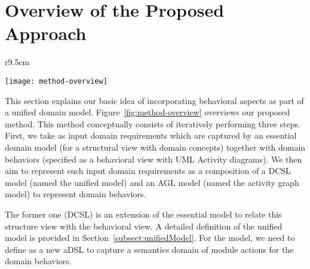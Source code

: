 \section{Overview of the Proposed Approach}
\label{sect:overviewApproach}
{\makeatletter
	\let\par\@@par
	\par{}
	\everypar{}
	\begin{wrapfigure}{r}{9.5cm}
		\begin{center}
			\vspace{-1cm}		\texttt{[image: method-overview]}
		\end{center}
		\vspace{-0.5cm}	
		\caption{An overview of our method.} %
		\label{fig:method-overview}
	\end{wrapfigure}
This section explains our basic idea of incorporating behavioral aspects as part of a unified domain model.
%
%
%
Figure~\ref{fig:method-overview} overviews our proposed method. This method conceptually consists of iteratively performing three steps. First, we take as input domain requirements which are captured by an essential domain model (for a structural view with domain concepts) together with domain behaviors (specified as a behavioral view with UML Activity diagrams). We then aim to represent such input domain requirements as a composition of a DCSL model (named the unified model) and an AGL model (named the activity graph model) to represent domain behaviors.
\par}%
\noindent 
The former one (DCSL) is an extension of the essential model to relate this structure view with the behavioral view. A detailed definition of the unified model is provided in Section~\ref{subsect:unifiedModel}. For the \agl model, we need to define \agl as a new aDSL to capture a semantics domain of module actions for the domain behaviors. %
